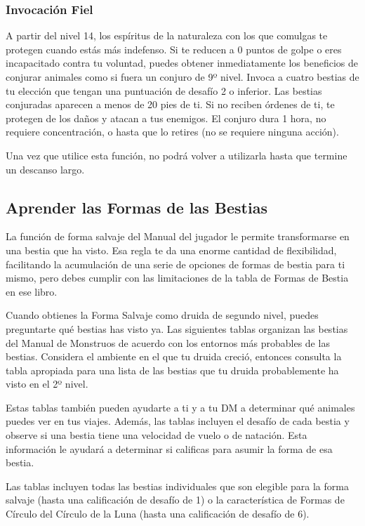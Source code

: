 \documentclass[a4paper,twocolumn,openany,10pt]{dndbook}
\begin{document}
\subsubsection{Invocación Fiel}
A partir del nivel 14, los espíritus de la naturaleza con los que comulgas te protegen cuando estás más indefenso. Si te reducen
a 0 puntos de golpe o eres incapacitado contra tu voluntad, puedes obtener inmediatamente los beneficios de conjurar animales
como si fuera un conjuro de 9º nivel. Invoca a cuatro bestias de tu elección que tengan una puntuación de desafío 2 o inferior.
Las bestias conjuradas aparecen a menos de 20 pies de ti. Si no reciben órdenes de ti, te protegen de los daños y atacan a tus
enemigos. El conjuro dura 1 hora, no requiere concentración, o hasta que lo retires (no se requiere ninguna acción).

Una vez que utilice esta función, no podrá volver a utilizarla hasta que termine un descanso largo.

\subsection{Aprender las Formas de las Bestias}

La función de forma salvaje del Manual del jugador le permite transformarse en una bestia que ha visto. Esa regla te da una
enorme cantidad de flexibilidad, facilitando la acumulación de una serie de opciones de formas de bestia para ti mismo, pero
debes cumplir con las limitaciones de la tabla de Formas de Bestia en ese libro.

Cuando obtienes la Forma Salvaje como druida de segundo nivel, puedes preguntarte qué bestias has visto ya. Las siguientes
tablas organizan las bestias del Manual de Monstruos de acuerdo con los entornos más probables de las bestias. Considera el
ambiente en el que tu druida creció, entonces consulta la tabla apropiada para una lista de las bestias que tu druida
probablemente ha visto en el 2º nivel.

Estas tablas también pueden ayudarte a ti y a tu DM a determinar qué animales puedes ver en tus viajes. Además, las tablas
incluyen el desafío de cada bestia y observe si una bestia tiene una velocidad de vuelo o de natación. Esta información le
ayudará a determinar si calificas para asumir la forma de esa bestia.

Las tablas incluyen todas las bestias individuales que son elegible para la forma salvaje (hasta una calificación de desafío de
1) o la característica de Formas de Círculo del Círculo de la Luna (hasta una calificación de desafío de 6). 
\end{document}
